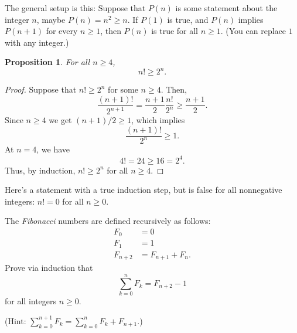 \documentclass[12pt]{article}
\newtheorem{proposition}{Proposition}
\theoremstyle{definition}
\begin{document}
The general setup is this: Suppose that $P(n)$ is some statement about the
integer $n$, maybe $P(n) = n^2 \geq n$. If $P(1)$ is true, and $P(n)$ implies
$P(n + 1)$ for every $n \geq 1$, then $P(n)$ is true for all $n \geq 1$. (You
can replace $1$ with any integer.)

\begin{proposition}
    For all $n \geq 4$,
    \begin{equation*}
        n! \geq 2^n.
    \end{equation*}
\end{proposition}

\begin{proof}
    Suppose that $n! \geq 2^n$ for some $n \geq 4$. Then,
    \begin{equation*}
        \frac{(n + 1)!}{2^{n + 1}} = \frac{n + 1}{2} \frac{n!}{2^n} \geq \frac{n + 1}{2}.
    \end{equation*}
    Since $n \geq 4$ we get $(n + 1) / 2 \geq 1$, which implies
    \begin{equation*}
        \frac{(n + 1)!}{2^n} \geq 1.
    \end{equation*}
    At $n = 4$, we have
    \begin{equation*}
        4! = 24 \geq 16 = 2^4.
    \end{equation*}
    Thus, by induction, $n! \geq 2^n$ for all $n \geq 4$.
\end{proof}

Here's a statement with a true induction step, but is false for all nonnegative
integers: $n! = 0$ for all $n \geq 0$.

\begin{Exercise}
    The \emph{Fibonacci} numbers are defined recursively as follows:
    \begin{align*}
        F_0 &= 0 \\
        F_1 &= 1 \\
        F_{n + 2} &= F_{n + 1} + F_n.
    \end{align*}
    Prove via induction that
    \begin{equation*}
        \sum_{k = 0}^n F_k = F_{n + 2} - 1
    \end{equation*}
    for all integers $n \geq 0$.

    (Hint: $\sum_{k = 0}^{n + 1} F_k = \sum_{k = 0}^n F_k + F_{n + 1}$.)
\end{Exercise}
\end{document}
